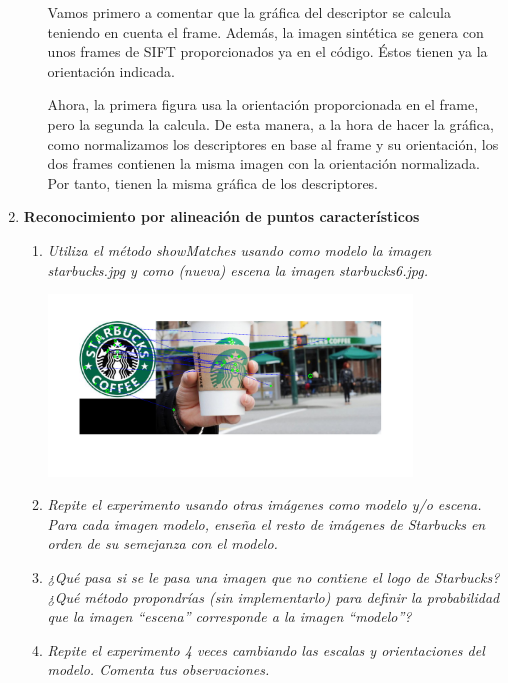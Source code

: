 \documentclass{article}
\begin{document}
\begin{enumerate}
\begin{enumerate}
Vamos primero a comentar que la gráfica del descriptor se calcula teniendo en cuenta el frame. Además, la imagen sintética se genera con unos frames de SIFT proporcionados ya en el código. Éstos tienen ya la orientación indicada.

Ahora, la primera figura usa la orientación proporcionada en el frame, pero la segunda la calcula. De esta manera, a la hora de hacer la gráfica, como normalizamos los descriptores en base al frame y su orientación, los dos frames contienen la misma imagen con la orientación normalizada. Por tanto, tienen la misma gráfica de los descriptores.

 \end{enumerate}

\newpage

 \item \textbf{ Reconocimiento por alineación de puntos característicos}

 \begin{enumerate}
 \item \textit{Utiliza  el  método  showMatches usando  como  modelo  la  imagen 
 starbucks.jpg y como (nueva) escena la imagen starbucks6.jpg.}

\begin{center}
	\includegraphics[width=0.8\textwidth]{ej35a.png}
\end{center}

 \item \textit{Repite el experimento  usando otras imágenes  como modelo  y/o escena. 
Para cada imagen modelo, enseña el  resto de imágenes de Starbucks en orden de su semejanza con el modelo.}



 \item \textit{¿Qué pasa si se le pasa una imagen que no contiene el logo de Starbucks? 
¿Qué  método  propondrías  (sin  implementarlo)  para  definir la 
probabilidad que la imagen “escena” corresponde a la imagen “modelo”?}

 \item \textit {Repite el experimento 4 veces cambiando las escalas y orientaciones del 
modelo. Comenta tus observaciones.}
 
 \end{enumerate}

\end{enumerate}
\end{document}
